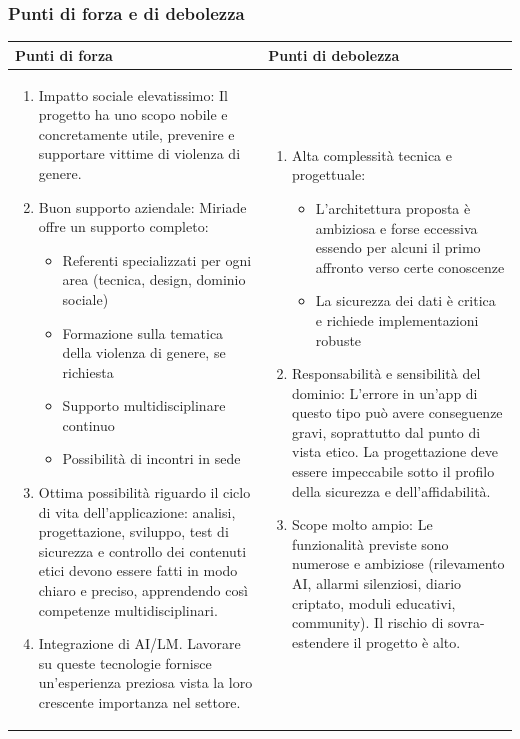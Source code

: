 \documentclass[a4paper,11pt]{article}
\begin{document}
\subsubsection{Punti di forza e di debolezza}
{\footnotesize
\begin{tabularx}{\textwidth}{|X|X|}
\hline
\rowcolor{lightgray!40} %
\textbf{Punti di forza} & \textbf{Punti di debolezza} \\
\hline
\begin{enumerate}
\item Impatto sociale elevatissimo: Il progetto ha uno scopo nobile e concretamente utile, prevenire e supportare vittime di violenza di genere.
\item Buon supporto aziendale: Miriade offre un supporto completo:
\begin{itemize}
  \item Referenti specializzati per ogni area (tecnica, design, dominio sociale)
  \item Formazione sulla tematica della violenza di genere, se richiesta
  \item Supporto multidisciplinare continuo
  \item Possibilità di incontri in sede
\end{itemize}
\item Ottima possibilità riguardo il ciclo di vita dell'applicazione: analisi, progettazione, sviluppo, test di sicurezza e controllo dei contenuti etici devono essere fatti in modo chiaro e preciso, apprendendo così competenze multidisciplinari.
\item Integrazione di AI/LM. Lavorare su queste tecnologie fornisce un'esperienza preziosa vista la loro crescente importanza nel settore.
\end{enumerate}
 & \begin{enumerate}
\item Alta complessità tecnica e progettuale:
\begin{itemize}
  \item L'architettura proposta è ambiziosa e forse eccessiva essendo per alcuni il primo affronto verso certe conoscenze
  \item La sicurezza dei dati è critica e richiede implementazioni robuste
\end{itemize}
\item 	Responsabilità e sensibilità del dominio: L'errore in un'app di questo tipo può avere conseguenze gravi, soprattutto dal punto di vista etico. La progettazione deve essere impeccabile sotto il profilo della sicurezza e dell'affidabilità.
\item Scope molto ampio: Le funzionalità previste sono numerose e ambiziose (rilevamento AI, allarmi silenziosi, diario criptato, moduli educativi, community). Il rischio di sovra-estendere il progetto è alto.
\end{enumerate} \\
\hline
\end{tabularx}
}
\end{document}
